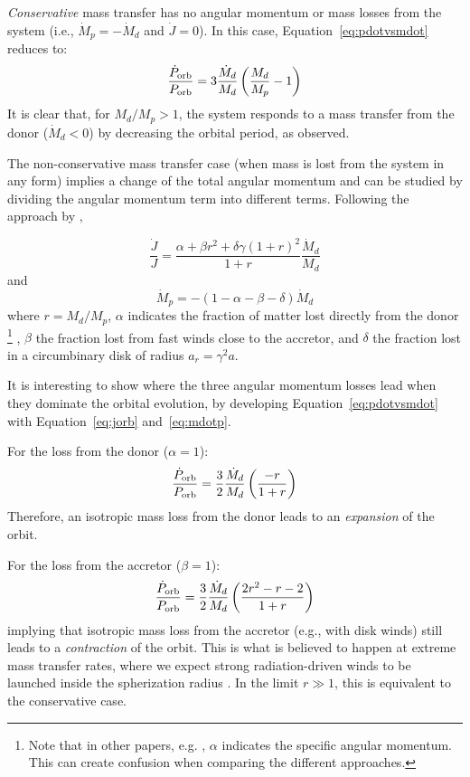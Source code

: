 \documentclass[twocolumn]{aastex631}
\newcommand{\Porbdot}{\ensuremath{\dot{P}_{\rm orb}}}
\newcommand{\Porb}{\ensuremath{P_{\rm orb}}}
\newcommand{\Mdot}{\ensuremath{\dot{M}}}
\begin{document}
\textit{Conservative} mass transfer has no angular momentum or mass losses from the system (i.e., $\Mdot_p=-\Mdot_d$ and $\dot{J}=0$).
In this case, Equation~\ref{eq:pdotvsmdot} reduces to:
\begin{equation}\label{eq:pdotcons}
    \frac{\Porbdot}{\Porb} = 3\frac{\Mdot_d}{M_d}\left( \frac{M_d}{M_p} - 1\right)
\end{equation}
It is clear that, for $M_d/M_p>1$, the system responds to a mass transfer from the donor ($\Mdot_d<0$) by decreasing the orbital period, as observed.

The non-conservative mass transfer case (when mass is lost from the system in any form) implies a change of the total angular momentum and can be studied by dividing the angular momentum term into different terms.
Following the approach by \citet{1994inbi.conf..263V,sobermanStabilityCriteriaMass1997,taurisFormationEvolutionCompact2006},

\begin{equation}\label{eq:jorb}
    \frac{\dot{J}}{J} = \frac{\alpha + \beta r^2 + \delta\gamma(1 + r)^2}{1 + r} \frac{\Mdot_d}{M_d}
\end{equation}
and
\begin{equation}\label{eq:mdotp}
    \Mdot_p = -(1 - \alpha -\beta -\delta) \Mdot_d
\end{equation}
where $r=M_d/M_p$, $\alpha$ indicates the fraction of matter lost directly from the donor%
\footnote{Note that in other papers, e.g. \citep{jossNeutronStarsInteracting1984}, $\alpha$ indicates the specific angular momentum. This can create confusion when comparing the different approaches.}%
, $\beta$ the fraction lost from fast winds close to the accretor, and $\delta$ the fraction lost in a circumbinary disk of radius $a_r = \gamma^2 a$.

It is interesting to show where the three angular momentum losses lead when they dominate the orbital evolution, by developing Equation~\ref{eq:pdotvsmdot} with Equation~\ref{eq:jorb} and~\ref{eq:mdotp}.

For the loss from the donor ($\alpha=1$):
\begin{equation}\label{eq:alpha}
\frac{\Porbdot}{\Porb} = \frac{3}{2}\frac{\Mdot_d}{M_d}\left(\frac{-r}{1+r}\right)
\end{equation}
Therefore, an isotropic mass loss from the donor leads to an \textit{expansion} of the orbit.

For the loss from the accretor ($\beta=1$):
\begin{equation}\label{eq:beta}
\frac{\Porbdot}{\Porb} = \frac{3}{2}\frac{\Mdot_d}{M_d}\left(\frac{2r^2 - r - 2}{1+r}\right)
\end{equation}
implying that isotropic mass loss from the accretor (e.g., with disk winds) still leads to a \textit{contraction} of the orbit.
This is what is believed to happen at extreme mass transfer rates, where we expect strong radiation-driven winds to be launched inside the spherization radius \citep{shakuraBlackHolesBinary1973}.
In the limit $r\gg1$, this is equivalent to the conservative case.
\end{document}
